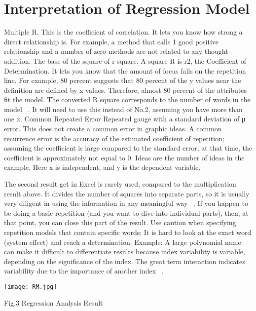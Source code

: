 \documentclass[10pt]{aa}
\begin{document}
\section{Interpretation of Regression Model}
Multiple R. This is the coefficient of correlation. It lets you know how strong a direct relationship is. For example, a method that calls 1 good positive relationship and a number of zero methods are not related to any thought addition. The base of the square of r square. A square R is r2, the Coefficient of Determination. It lets you know that the amount of focus falls on the repetition line. For example, 80 percent suggests that 80 percent of the y values near the definition are defined by x values. Therefore, almost 80 percent of the attributes fit the model. The converted R square corresponds to the number of words in the model ~\cite{ai_2021_beneficial}. It will need to use this instead of No.2, assuming you have more than one x. Common Repeated Error Repeated gauge with a standard deviation of μ error. This does not create a common error in graphic ideas. A common recurrence error is the accuracy of the estimated coefficient of repetition; assuming the coefficient is large compared to the standard error, at that time, the coefficient is approximately not equal to 0. Ideas are the number of ideas in the example. Here x is independent, and y is the dependent variable.

The second result get in Excel is rarely used, compared to the multiplication result above. It divides the number of squares into separate parts, so it is usually very diligent in using the information in any meaningful way ~\cite{liakos_2018_machine}. If you happen to be doing a basic repetition (and you want to dive into individual parts), then, at that point, you can close this part of the result. Use caution when specifying repetition models that contain specific words; It is hard to look at the exact word (system effect) and reach a determination. Example: A large polynomial name can make it difficult to differentiate results because index variability is variable, depending on the significance of the index. The great term interaction indicates variability due to the importance of another index ~\cite{hart_2021_machine}.

\begin{itemize}
\texttt{[image: RM.jpg]}
\caption{Fig.3 Regression Analysis Result}
\label{FigVibStab}
\end{itemize}
 
\end{document}
